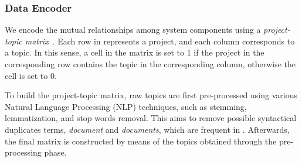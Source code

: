 \subsubsection{Data Encoder} \label{sec:DataEncoder}


We encode the mutual relationships among system components using a \emph{project-topic matrix}~\cite{Sarwar:2001:ICF:371920.372071}. 
Each row in represents a project, and each column corresponds to a topic. In this sense, a cell in the matrix is set to 1 if the project in the corresponding row contains the topic in the corresponding column, otherwise the cell is set to 0.

To build the project-topic matrix, raw topics are first pre-process\-ed using various Natural Language Processing (NLP) techniques, such as stemming, lemmatization, and stop words removal. This aims to remove possible syntactical duplicates terms, \eg \textit{document} and \textit{documents}, which are frequent in \GH. Afterwards, the final matrix is constructed by means of the topics obtained through the pre-processing phase. %




